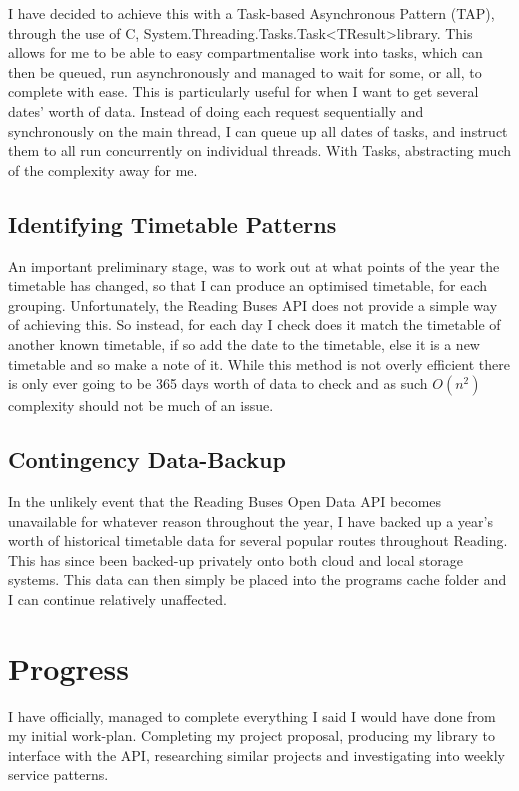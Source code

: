 \documentclass{article}
\newcommand{\CS}{C\nolinebreak\hspace{-.05em}\raisebox{.6ex}{\tiny\bf \#}}
\begin{document}
\par 
I have decided to achieve this with a Task-based Asynchronous Pattern (TAP)\cite{RN29}, through the use of \CS, System.Threading.Tasks.Task\textless TResult\textgreater  library. This allows for me to be able to easy compartmentalise work into tasks, which can then be queued, run asynchronously and managed to wait for some, or all, to complete with ease. This is particularly useful for when I want to get several dates' worth of data. Instead of doing each request sequentially and synchronously on the main thread, I can queue up all dates of tasks, and instruct them to all run concurrently on individual threads. With Tasks, abstracting much of the complexity away for me.  




\subsection{Identifying Timetable Patterns}
An important preliminary stage, was to work out at what points of the year the timetable has changed, so that I can produce an optimised timetable, for each grouping. Unfortunately, the Reading Buses API does not provide a simple way of achieving this. So instead, for each day I check does it match the timetable of another known timetable, if so add the date to the timetable, else it is a new timetable and so make a note of it. While this method is not overly efficient there is only ever going to be 365 days worth of data to check and as such $O(n^2)$ complexity should not be much of an issue. 


\subsection{Contingency Data-Backup}
In the unlikely event that the Reading Buses Open Data API becomes unavailable for whatever reason throughout the year, I have backed up a year's worth of historical timetable data for several popular routes throughout Reading. This has since been backed-up privately onto both cloud and local storage systems. This data can then simply be placed into the programs cache folder and I can continue relatively unaffected. 




\section{Progress}

I have officially, managed to complete everything I said I would have done from my initial work-plan. Completing my project proposal, producing my library to interface with the API, researching similar projects and investigating into weekly service patterns. 
\end{document}
